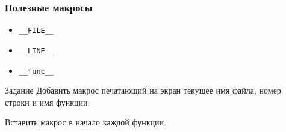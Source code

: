 \begin{frame}[fragile]
	\frametitle{Полезные макросы}

	\begin{itemize}
		\item {\tt \_\_FILE\_\_}
		\item {\tt \_\_LINE\_\_}
		\item {\tt \_\_func\_\_}
	\end{itemize}

	\begin{block}{Задание}
		Добавить макрос печатающий на экран текущее имя файла, номер строки и имя функции.

		Вставить макрос в начало каждой функции.
	\end{block}

\end{frame}



